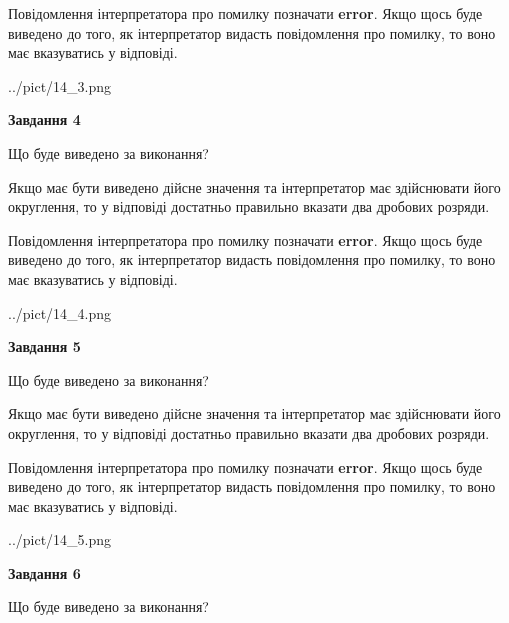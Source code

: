 \documentclass[12pt, ukrainian]{article}
\begin{document}
{\begin {Large}
Повідомлення інтерпретатора про помилку позначати \textbf{error}.
Якщо щось буде виведено до того, як інтерпретатор видасть повідомлення про помилку, 
то воно має вказуватись у відповіді. \par

\begin{center}
	{../pict/14_3.png}
\end{center}
\newpage

{\begin {center}\textbf{Завдання 4}\end {center}}\par
Що буде виведено за виконання? \par

Якщо має бути виведено дійсне значення та інтерпретатор має здійснювати його округлення, 
то у відповіді достатньо правильно вказати два дробових розряди.

Повідомлення інтерпретатора про помилку позначати \textbf{error}.
Якщо щось буде виведено до того, як інтерпретатор видасть повідомлення про помилку, 
то воно має вказуватись у відповіді. \par

\begin{center}
	{../pict/14_4.png}
\end{center}
\newpage

{\begin {center}\textbf{Завдання 5}\end {center}}\par
Що буде виведено за виконання? \par

Якщо має бути виведено дійсне значення та інтерпретатор має здійснювати його округлення, 
то у відповіді достатньо правильно вказати два дробових розряди.

Повідомлення інтерпретатора про помилку позначати \textbf{error}.
Якщо щось буде виведено до того, як інтерпретатор видасть повідомлення про помилку, 
то воно має вказуватись у відповіді. \par

\begin{center}
	{../pict/14_5.png}
\end{center}
\newpage

{\begin {center}\textbf{Завдання 6}\end {center}}\par
Що буде виведено за виконання? \par


\end{Large}}
\end{document}
